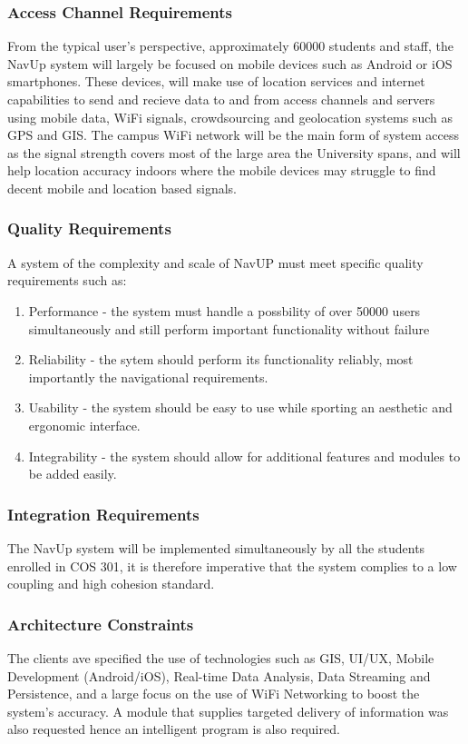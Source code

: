 \documentclass[11pt,a4paper]{article}
\begin{document}
			\subsubsection{Access Channel Requirements}
				From the typical user's perspective, approximately 60000 students and staff, the NavUp system will largely be focused on mobile devices such as Android or iOS smartphones.
				These devices, will make use of location services and internet capabilities to send and recieve data to and from access channels and servers using mobile data,
				WiFi signals, crowdsourcing and geolocation systems such as GPS and GIS. The campus WiFi network will be the main form of system access as the signal
				strength covers most of the large area the University spans, and will help location accuracy indoors where the mobile devices may struggle to find decent mobile
				and location based signals.
				
			\subsubsection{Quality Requirements}
				A system of the complexity and scale of NavUP must meet specific quality requirements such as:
				
				\begin{enumerate}
				\renewcommand{\labelenumi}{{\textbf{\arabic{enumi}.}}}
				\item Performance - the system must handle a possbility of over 50000 users simultaneously and still perform important functionality without failure
				\item Reliability - the sytem should perform its functionality reliably, most importantly the navigational requirements.
				\item Usability - the system should be easy to use while sporting an aesthetic and ergonomic interface.
				\item Integrability - the system should allow for additional features and modules to be added easily.
				\end{enumerate}
				
			\subsubsection{Integration Requirements}
				The NavUp system will be implemented simultaneously by all the students enrolled in COS 301, it is therefore imperative that the system complies to a low coupling and high cohesion standard.
			\subsubsection{Architecture Constraints}
				The clients ave specified the use of technologies such as GIS, UI/UX, Mobile Development (Android/iOS),  Real-time Data Analysis, Data Streaming and
				Persistence, and a large focus on the use of WiFi Networking to boost the system's accuracy. A module that supplies targeted delivery of information was also requested hence an intelligent program is also required.
				
\end{document}
